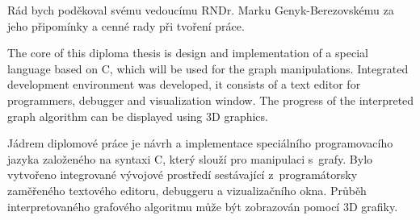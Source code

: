 \documentclass[11pt,twoside,a4paper]{book}
\begin{document}




\coverpagestarts



\acknowledgements
\noindent

\noindent Rád bych poděkoval svému vedoucímu RNDr. Marku Genyk-Berezovskému za jeho při\-po\-mín\-ky a cenné rady při tvoření práce.






\abstractpage
The core of this diploma thesis is design and implementation of a special language based on C, which will be used for the graph manipulations. Integrated development environment was developed, it consists of a text editor for programmers, debugger and visualization window. The progress of the interpreted graph algorithm can be displayed using 3D graphics.


\vspace{8ex}

\noindent
Jádrem diplomové práce je návrh a implementace speciálního programovacího jazyka za\-lo\-že\-né\-ho na syntaxi C, který slouží pro manipulaci s~grafy. Bylo vytvořeno integrované vývojové prostředí sestávající z~programátorsky zaměřeného textového editoru, debuggeru a vizualizačního okna. Průběh interpretovaného grafového algoritmu může být zobrazován pomocí 3D grafiky.
\end{document}

